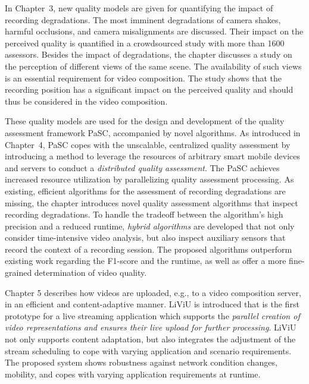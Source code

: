 In Chapter~3, new quality models are given for quantifying the impact of recording degradations. 
The most imminent degradations of camera shakes, harmful occlusions, and camera misalignments are discussed. Their impact on the perceived quality is quantified in a crowdsourced study with more than 1600 assessors. Besides the impact of degradations, the chapter discusses a study on the perception of different views of the same scene. The availability of such views is an essential requirement for video composition. The study shows that the recording position has a significant impact on the perceived quality and should thus be considered in the video composition.

These quality models are used for the design and development of the quality assessment framework \ac{PaSC}, accompanied by novel algorithms.
As introduced in Chapter~4, \ac{PaSC} copes with the unscalable, centralized quality assessment by introducing a method to leverage the resources of arbitrary smart mobile devices and servers to conduct a \emph{distributed quality assessment}.
The \ac{PaSC} achieves increased resource utilization by parallelizing quality assessment processing.
As existing, efficient algorithms for the assessment of recording degradations are missing, the chapter introduces novel quality assessment algorithms that inspect recording degradations.
To handle the tradeoff between the algorithm's high precision and a reduced runtime, \emph{hybrid algorithms} are developed that not only consider time-intensive video analysis, but also inspect auxiliary sensors that record the context of a recording session. The proposed algorithms outperform existing work regarding the F1-score and the runtime, as well as offer a more fine-grained determination of video quality.

Chapter 5 describes how videos are uploaded, e.g., to a video composition server, in an efficient and content-adaptive manner.
\ac{LiViU} is introduced that is the first prototype for a live streaming application which supports the \emph{parallel creation of video representations and ensures their live upload for further processing}.
\ac{LiViU} not only supports content adaptation, but also integrates the adjustment of the stream scheduling to cope with varying application and scenario requirements.
The proposed system shows robustness against network condition changes, mobility, and copes with varying application requirements at runtime.  

